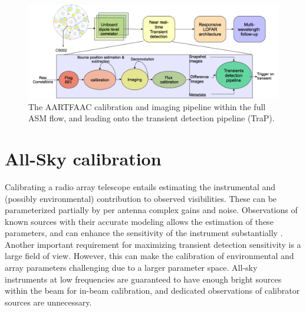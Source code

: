 \documentclass{aa}
\begin{document}
\begin{figure}[tbh]
\centering
\includegraphics[width=1\textwidth]{Figs/AFAAC_blkdia_latest.png}
\caption{The    AARTFAAC   calibration   and
  imaging  pipeline within the  full ASM  flow, and  leading onto  the transient
  detection pipeline (TraP).}
\label{fig:The-AARTFAAC-calibration}
\end{figure}

\section{\label{sec:Array-calibration-for}All-Sky calibration}
Calibrating  a radio  array telescope  entails estimating  the  instrumental and
(possibly environmental)  contribution to  observed visibilities.  These  can be
parameterized partially by per antenna  complex gains and noise. Observations of
known  sources with  their  accurate  modeling allows  the  estimation of  these
parameters,  and can  enhance the  sensitivity of  the  instrument substantially
 \citep{taylor1999synthesis}.   Another   important  requirement  for  maximizing
transient detection  sensitivity is  a large field  of view.  However,  this can
make the calibration of environmental  and array parameters challenging due to a
larger parameter  space.  All-sky instruments at low  frequencies are guaranteed
to  have enough  bright sources  within the  beam for  in-beam  calibration, and
dedicated observations  of calibrator sources are  unnecessary.
\end{document}
